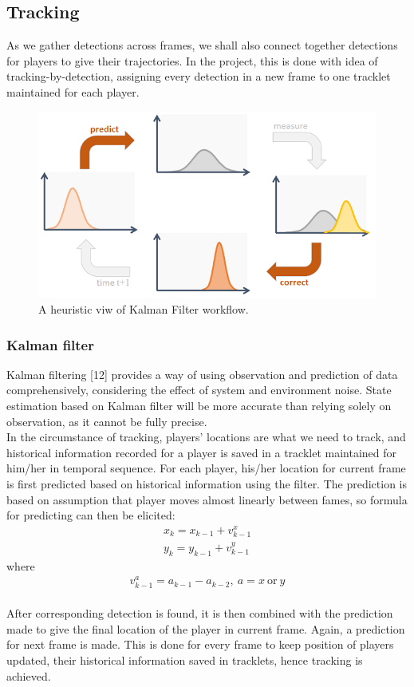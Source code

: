 \documentclass{article}
\begin{document}
\subsection{Tracking}
As we gather detections across frames, we shall also connect together detections for players to give their trajectories. In the project, this is done with idea of tracking-by-detection, assigning every detection in a new frame to one tracklet maintained for each player.
\begin{figure}
  \centering
  \includegraphics[scale=0.4]{report/pic/2/kf_workflow.jpeg} 
  \caption{A heuristic viw of Kalman Filter workflow.}
\end{figure}
\subsubsection{Kalman filter}
Kalman filtering [12] provides a way of using observation and prediction of data comprehensively, considering the effect of system and environment noise. State estimation based on Kalman filter will be more accurate than relying solely on observation, as it cannot be fully precise.\\
In the circumstance of tracking, players’ locations are what we need to track, and historical information recorded for a player is saved in a tracklet maintained for him/her in temporal sequence. For each player, his/her location for current frame is first predicted based on historical information using the filter. The prediction is based on assumption that player moves almost linearly between fames, so formula for predicting can then be elicited:\\
\begin{align*}
x_k = x_{k-1}+v_{k-1}^x \\
y_k = y_{k-1}+v_{k-1}^y
\end{align*}
where 
\begin{align*}
v_{k-1}^a = a_{k-1} - a_{k-2}, \: a=x \: \text{or} \:y
\end{align*}
\\
After corresponding detection is found, it is then combined with the prediction made to give the final location of the player in current frame. Again, a prediction for next frame is made. This is done for every frame to keep position of players updated, their historical information saved in tracklets, hence tracking is achieved.
\end{document}
